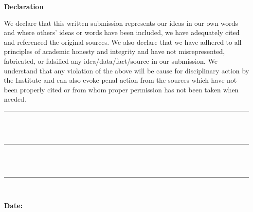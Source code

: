 \thispagestyle{empty}
\begin{center}
    {\Large \textbf{Declaration}}
\end{center}
\vspace{0.5cm}
\justifying
We declare that this written submission represents our ideas in our own words and where
others' ideas or words have been included, we have adequately cited and referenced the
original sources. We also declare that we have adhered to all principles of academic
honesty and integrity and have not misrepresented, fabricated, or falsified any
idea/data/fact/source in our submission. We understand that any violation of the above
will be cause for disciplinary action by the Institute and can also evoke penal action
from the sources which have not been properly cited or from whom proper permission has
not been taken when needed.

\vspace{2cm}
\begin{flushright}
    \rule{6cm}{0.5pt} \\[-0.4cm]
    \makebox[6cm]{\textbf{\StudentOne}} \\[0.5cm]
    \rule{6cm}{0.5pt} \\[-0.4cm]
    \makebox[6cm]{\textbf{\StudentTwo}} \\[0.5cm]
    \rule{6cm}{0.5pt} \\[-0.4cm]
    \makebox[6cm]{\textbf{\StudentThree}}
\end{flushright}
\vfill
\noindent \textbf{Date:}\\[2em]
\clearpage
